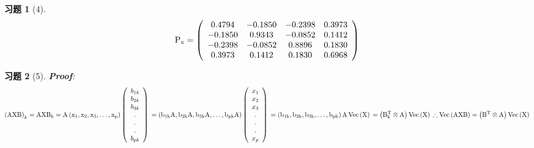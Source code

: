 \documentclass[12pt, oneside]{article}
\newtheorem*{exercise}{\textbf{习题}}
\begin{document}
  \begin{exercise}[4]
	\scriptsize
	\begin{equation*}
	  \rm{
		P_x = \left(
		\begin{array}{cccc}
		  0.4794 & -0.1850 & -0.2398 & 0.3973 \\
		  -0.1850 & 0.9343 & -0.0852 & 0.1412 \\
		  -0.2398 & -0.0852 & 0.8896 & 0.1830 \\
		  0.3973 & 0.1412 & 0.1830 & 0.6968 \\
		\end{array}
		\right)
	  }
	\end{equation*}
  \end{exercise}

  \begin{exercise}[5]
	\rm{
	  \textbf{Proof}:\\
	  \begin{equation*}
		  \left( \rm{AXB} \right)_k = \rm{AXB}_k \\
		  = \rm{A} \left( x_1, x_2, x_3, \dots , x_p \right)
		  \left(
		  \begin{array}{c}
			b_{1k} \\
			b_{2k} \\
			b_{3k} \\
			. \\
			. \\
			. \\
			b_{pk} \\
		  \end{array}
		  \right) \\
		  = \left( b_{1k}\rm{A}, b_{2k}\rm{A}, b_{3k}\rm{A}, \dots , b_{pk}\rm{A}\right) \left( 
		  \begin{array}{c}
			x_1 \\
			x_2 \\
			x_3 \\
			. \\
			. \\
			. \\
			x_p \\
		  \end{array}
		  \right) \\
		  = \left( b_{1k}, b_{2k}, b_{3k}, \dots , b_{pk}\right)\rm{A}\operatorname{Vec}\left( \rm{X} \right) \\
		  = \left( \rm{B}_k^T \otimes \rm{A} \right) \operatorname{Vec} \left( \rm{X} \right) \\ 
	  \therefore \operatorname{Vec}\left( \rm{AXB} \right)	= \left( \rm{B}^T \otimes \rm{A} \right) \operatorname{Vec} \left( \rm{X} \right)
	  \end{equation*}
	}
  \end{exercise}
\end{document}
